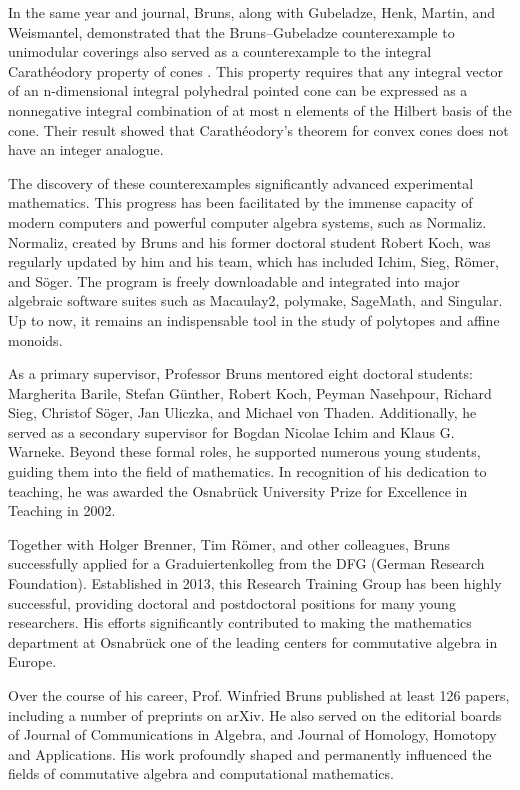 \documentclass[10pt]{amsart}
\begin{document}
	In the same year and journal, Bruns, along with Gubeladze, Henk, Martin, and Weismantel, demonstrated that the Bruns--Gubeladze counterexample to unimodular coverings also served as a counterexample to the integral Carathéodory property of cones \cite{BGHMW1999}. This property requires that any integral vector of an n-dimensional integral polyhedral pointed cone can be expressed as a nonnegative integral combination of at most n elements of the Hilbert basis of the cone. Their result showed that Carath\'{e}odory's theorem for convex cones does not have an integer analogue.
	
	The discovery of these counterexamples significantly advanced experimental mathematics. This progress has been facilitated by the immense capacity of modern computers and powerful computer algebra systems, such as Normaliz. Normaliz, created by Bruns and his former doctoral student Robert Koch, was regularly updated by him and his team, which has included Ichim, Sieg, R\"{o}mer, and S\"{o}ger. The program is freely downloadable and integrated into major algebraic software suites such as Macaulay2, polymake, SageMath, and Singular. Up to now, it remains an indispensable tool in the study of polytopes and affine monoids.
	
	As a primary supervisor, Professor Bruns mentored eight doctoral students: Margherita Barile, Stefan G\"{u}nther, Robert Koch, Peyman Nasehpour, Richard Sieg, Christof S\"{o}ger, Jan Uliczka, and Michael von Thaden. Additionally, he served as a secondary supervisor for Bogdan Nicolae Ichim and Klaus G. Warneke. Beyond these formal roles, he supported numerous young students, guiding them into the field of mathematics. In recognition of his dedication to teaching, he was awarded the Osnabr\"{u}ck University Prize for Excellence in Teaching in 2002.
	
	Together with Holger Brenner, Tim R\"{o}mer, and other colleagues, Bruns successfully applied for a Graduiertenkolleg from the DFG (German Research Foundation). Established in 2013, this Research Training Group has been highly successful, providing doctoral and postdoctoral positions for many young researchers. His efforts significantly contributed to making the mathematics department at Osnabr\"{u}ck one of the leading centers for commutative algebra in Europe.
	
	Over the course of his career, Prof. Winfried Bruns published at least 126 papers, including a number of preprints on arXiv. He also served on the editorial boards of Journal of Communications in Algebra, and Journal of Homology, Homotopy and Applications. His work profoundly shaped and permanently influenced the fields of commutative algebra and computational mathematics.
	
\end{document}
